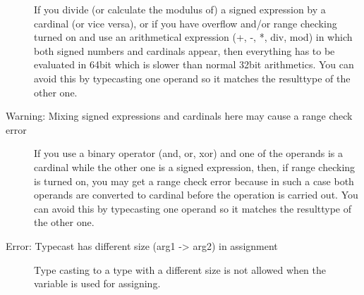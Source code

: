 \begin{description}
 If you divide (or calculate the modulus of) a signed expression by a cardinal (or vice versa),
 or if you have overflow and/or range checking turned on and use an arithmetical
 expression (+, -, *, div, mod) in which both signed numbers and cardinals appear,
 then everything has to be evaluated in 64bit which is slower than normal
 32bit arithmetics. You can avoid this by typecasting one operand so it
 matches the resulttype of the other one.
\item [Warning: Mixing signed expressions and cardinals here may cause a range check error]
 If you use a binary operator (and, or, xor) and one of
 the operands is a cardinal while the other one is a signed expression, then,
 if range checking is turned on, you may get a range check error because in
 such a case both operands are converted to cardinal before the operation is
 carried out. You can avoid this by typecasting one operand so it
 matches the resulttype of the other one.
\item [Error: Typecast has different size (arg1 -> arg2) in assignment]
 Type casting to a type with a different size is not allowed when the variable is
 used for assigning.
 \end{description}
